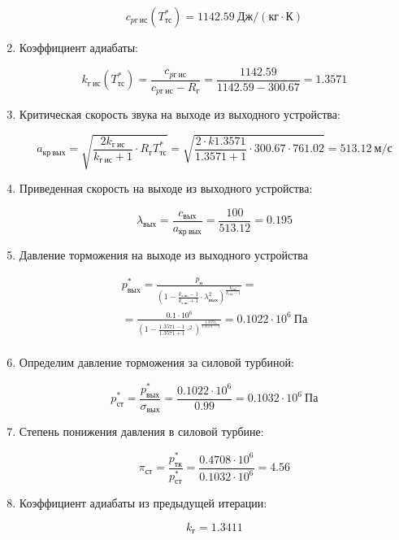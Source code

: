 \documentclass[a4paper,10pt]{article}
\begin{document}
\begin{enumerate}
	\[ c_{pг\ ис} (T_{тс}^*) = 1142.59\ Дж/ (кг \cdot К) \]
	
	\item Коэффициент адиабаты:
	
	\[
	k_{г\ ис} (T_{тс}^*)  = \frac{ c_{pг\ ис} }{ c_{pг\ ис} - R_г } = 
			\frac{ 1142.59 }{ 1142.59 - 300.67 } = 
			1.3571
	\]

	\item Критическая скорость звука на выходе из выходного устройства:

	\[
		a_{кр\ вых} = \sqrt{\frac{2 k_{г\ ис}}{k_{г\ ис} + 1} \cdot R_г T_{тс}^* } =
		\sqrt{
			\frac{2 \cdot k1.3571
			}{
			1.3571 + 1} \cdot
			300.67 \cdot 761.02
		} =
		513.12\ м/с
	\]

	\item Приведенная скорость на выходе из выходного устройства:

	\[
		\lambda_{вых} = \frac{c_{вых}}{a_{кр\ вых}} =
			\frac{100}{513.12} =
		0.195
	\]

	\item Давление торможения на выходе из выходного устройства
	
	\begin{gather*}
	    p_{вых}^* = \frac{ p_н
				}{
					\left(
						1 - \frac{ k_{г\ ис} - 1 }{ k_{г\ ис} + 1 } \cdot \lambda_{вых} ^ 2
					\right)
						^ {
							\frac{ k_{г\ ис} }{ k_{г\ ис} - 1 }
						}
				} =\\
	    = \frac{ 0.1 \cdot 10^6
		}{
			\left(
				1 - \frac{ 1.3571 - 1 }{ 1.3571 + 1 } \cdot  ^ 2
			\right)
				^ {
					\frac{ 1.3571 }{ 1.3571 - 1 }
				}
				} =
		0.1022 \cdot 10^6\ Па\\
	\end{gather*}
	
	\item Определим давление торможения за силовой турбиной:
	
	\[
	p_{ст}^* = \frac{ p_{вых}^* }{ \sigma_{вых} } = \frac{ 0.1022 \cdot 10^6 }{ 0.99 } = 
			0.1032 \cdot 10^6\ Па
	\]

	\item Степень понижения давления в силовой турбине:
	
	\[ \pi_{ст} = \frac{ p_{тк}^* }{ p_{ст}^* } =
			\frac{ 
				0.4708 \cdot 10^6 
			}{ 
				0.1032 \cdot 10^6 
			} = 
			4.56
	\]
	
	\item Коэффициент адиабаты из предыдущей итерации:
	
	\[ k_г = 1.3411 \]
	

\end{enumerate}
\end{document}
